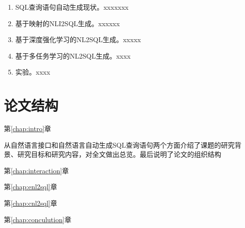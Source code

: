 \begin{enumerate}
  \item SQL查询语句自动生成现状。xxxxxxx
  \item 基于映射的NLI2SQL生成。xxxxxx
  \item 基于深度强化学习的NL2SQL生成。xxxxx
  \item 基于多任务学习的NL2SQL生成。xxxx
  \item 实验。xxxx
\end{enumerate}

\section{论文结构}
\label{intro:structure}
第\ref{chap:intro}章   

从自然语言接口和自然语言自动生成SQL查询语句两个方面介绍了课题的研究背景、研究目标和研究内容，对全文做出总览。最后说明了论文的组织结构

第\ref{chap:interaction}章   

第\ref{chap:enl2sql}章   

第\ref{chap:cnl2sql}章   

第\ref{chap:conculution}章   
